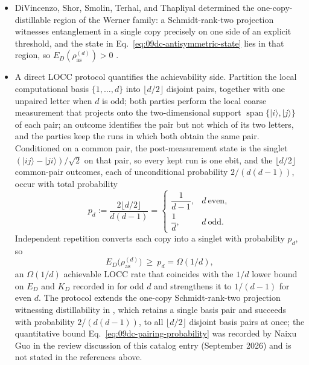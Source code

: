 \begin{itemize}
  \item DiVincenzo, Shor, Smolin, Terhal, and Thapliyal determined the
  one-copy-distillable region of the Werner family: a Schmidt-rank-two
  projection witnesses entanglement in a single copy precisely on one side of
  an explicit threshold, and the state in
  Eq.~\eqref{eq:09dc-antisymmetric-state} lies in that region, so
  $E_D(\rho_{\mathrm{as}}^{(d)})>0$
  .

  \item A direct LOCC protocol quantifies the achievability side.  Partition the
  local computational basis $\{1,\dots,d\}$ into $\lfloor d/2\rfloor$
  disjoint pairs, together with one unpaired letter when $d$ is odd; both
  parties perform the local coarse measurement that projects onto the
  two-dimensional support $\operatorname{span}\{\lvert i\rangle,\lvert j\rangle\}$ of each
  pair; an outcome identifies the pair but not which of its two letters,
  and the parties keep the runs in which both obtain the same pair.  Conditioned on a common pair, the post-measurement state is the
  singlet $(\lvert ij\rangle-\lvert ji\rangle)/\sqrt{2}$ on that pair, so every kept
  run is one ebit, and the $\lfloor d/2\rfloor$ common-pair
  outcomes, each of unconditional probability $2/(d(d-1))$, occur with total
  probability
  \begin{equation}
    p_d:=\frac{2\lfloor d/2\rfloor}{d(d-1)}
    =\begin{cases}
       \dfrac{1}{d-1}, & d\ \text{even},\\[4pt]
       \dfrac{1}{d}, & d\ \text{odd}.
     \end{cases}
    \label{eq:09dc-pairing-probability}
  \end{equation}
  Independent repetition converts each copy into a singlet with probability
  $p_d$, so
  \begin{equation}
    E_D\bigl(\rho_{\mathrm{as}}^{(d)}\bigr)\ \ge\ p_d=\Omega(1/d),
    \label{eq:09dc-pairing-bound}
  \end{equation}
  an $\Omega(1/d)$ achievable LOCC rate that coincides with the $1/d$ lower
  bound on $E_D$ and $K_D$ recorded in
   for odd $d$ and
  strengthens it to $1/(d-1)$ for even $d$.  The protocol extends the
  one-copy Schmidt-rank-two projection witnessing distillability in
  , which retains a single
  basis pair and succeeds with probability $2/(d(d-1))$, to all
  $\lfloor d/2\rfloor$ disjoint basis pairs at once; the quantitative bound
  Eq.~\eqref{eq:09dc-pairing-probability} was recorded by Naixu Guo in the
  review discussion of this catalog entry (September 2026) and is not stated
  in the references above.


\end{itemize}
